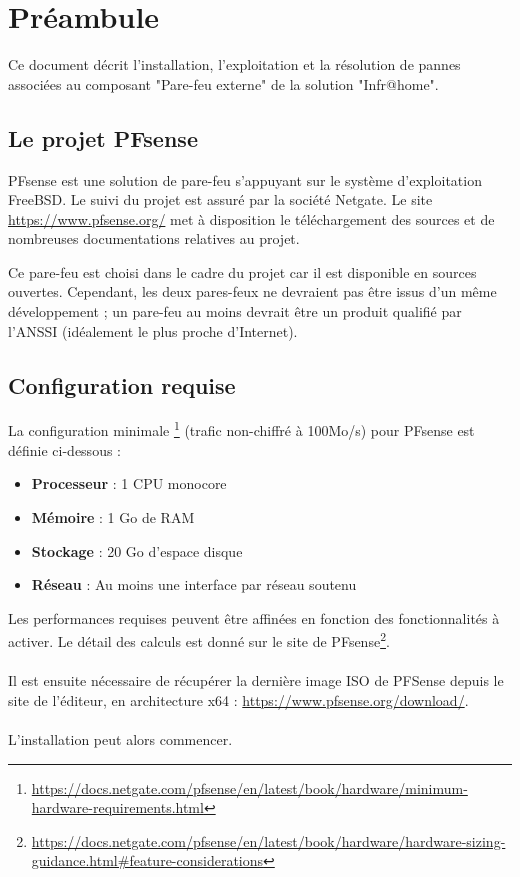 \section{Préambule}
Ce document décrit l'installation, l'exploitation et la résolution de pannes associées au composant "Pare-feu externe" de la solution "Infr@home".\\

\subsection{Le projet PFsense}
PFsense est une solution de pare-feu s'appuyant sur le système d'exploitation FreeBSD. Le suivi du projet est assuré par la société Netgate. Le site \url{https://www.pfsense.org/} met à disposition le téléchargement des sources et de nombreuses documentations relatives au projet.

\begin{warning}
    Ce pare-feu est choisi dans le cadre du projet car il est disponible en sources ouvertes. Cependant, les deux pares-feux ne devraient pas être issus d'un même développement ; un pare-feu au moins devrait être un produit qualifié par l'ANSSI (idéalement le plus proche d'Internet).
\end{warning}

\subsection{Configuration requise}
La configuration minimale \footnote{\url{https://docs.netgate.com/pfsense/en/latest/book/hardware/minimum-hardware-requirements.html}} (trafic non-chiffré à 100Mo/s) pour PFsense est définie ci-dessous :
\begin{itemize}
    \item \textbf{Processeur} : 1 CPU monocore
    \item \textbf{Mémoire} : 1 Go de RAM
    \item \textbf{Stockage} : 20 Go d'espace disque
    \item \textbf{Réseau} : Au moins une interface par réseau soutenu
\end{itemize}

Les performances requises peuvent être affinées en fonction des fonctionnalités à activer. Le détail des calculs est donné sur le site de PFsense\footnote{\url{https://docs.netgate.com/pfsense/en/latest/book/hardware/hardware-sizing-guidance.html\#feature-considerations}}.\\
~\\
Il est ensuite nécessaire de récupérer la dernière image ISO de PFSense depuis le site de l'éditeur, en architecture x64 : \url{https://www.pfsense.org/download/}.\\
~\\
L'installation peut alors commencer.